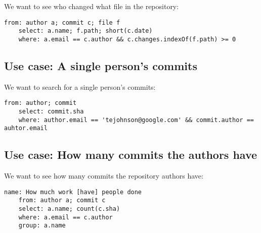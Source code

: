 We want to see who changed what file in the repository:

\begin{lstlisting}[caption={whochanged.yaml}]
	from: author a; commit c; file f
	select: a.name; f.path; short(c.date)
	where: a.email == c.author && c.changes.indexOf(f.path) >= 0
\end{lstlisting}

\subsection{Use case: A single person's commits}

We want to search for a single person's commits:

\begin{lstlisting}[caption={authorcommits.yaml}]
	from: author; commit
	select: commit.sha
	where: author.email == 'tejohnson@google.com' && commit.author == auhtor.email
\end{lstlisting}

\subsection{Use case: How many commits the authors have}

We want to see how many commits the repository authors have:

\begin{lstlisting}[caption={howmuchwork.yaml}]
	name: How much work [have] people done
	from: author a; commit c
	select: a.name; count(c.sha)
	where: a.email == c.author
	group: a.name
\end{lstlisting}